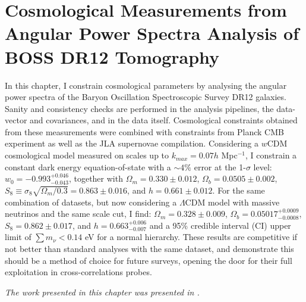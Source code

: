 %
\chapter{Cosmological Measurements from Angular Power Spectra Analysis of BOSS DR12 Tomography}
\label{Chap:BOSS-Cosmo}

\vspace*{\fill}

In this chapter, I constrain cosmological parameters by analysing the angular power spectra of the Baryon Oscillation Spectroscopic Survey DR12 galaxies. Sanity and consistency checks are performed in the analysis pipelines, the data-vector and covariances, and in the data itself. Cosmological constraints obtained from these measurements were combined with constraints from Planck CMB experiment as well as the JLA supernovae compilation. Considering a $w$CDM cosmological model measured on scales up to $k_{max} = 0.07h$ Mpc$^{-1}$, I constrain a constant dark energy equation-of-state with a $\sim 4\%$ error at the 1-$\sigma$ level: $w_0 = -0.993^{+0.046}_{-0.043}$, together with $\Omega_m = 0.330\pm 0.012$, $\Omega_b = 0.0505 \pm 0.002$, $S_8 \equiv \sigma_8 \sqrt{\Omega_m/0.3} = 0.863 \pm 0.016$, and $h = 0.661 \pm 0.012$. For the same combination of datasets, but now considering a $\Lambda$CDM model with massive neutrinos and the same scale cut, I find: $\Omega_m = 0.328 \pm 0.009$, $\Omega_b = 0.05017^{+0.0009}_{-0.0008}$, $S_8 = 0.862 \pm 0.017$, and $h = 0.663^{+0.006}_{-0.007}$ and a 95\% credible interval (CI) upper limit of $\sum m_{\nu} < 0.14$ eV for a normal hierarchy. These results are competitive if not better than standard analyses with the same dataset, and demonstrate this should be a method of choice for future surveys, opening the door for their full exploitation in cross-correlations probes.

\textit{The work presented in this chapter was presented in \citet{2018LoureiroBOSS}.} 
\newpage
